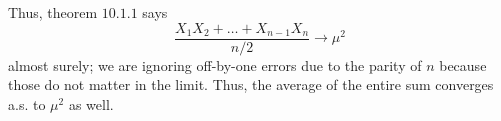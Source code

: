 \documentclass[11pt, headheight=30pt]{scrartcl}
\begin{document}
Thus, theorem $10.1.1$ says
\[
    \frac{X_1X_2 + \dots + X_{n-1}{X_n}}{n/2}\to \mu^2    
\]
almost surely; we are ignoring off-by-one errors due to the parity
of $n$ because those do not matter in the limit. Thus,
the average of the entire sum converges a.s. to $\mu^2$ as well.






\end{document}

